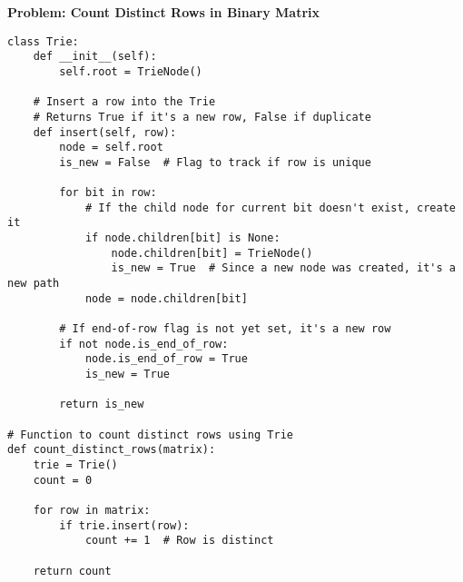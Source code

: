 \noindent\textbf{Problem: Count Distinct Rows in Binary Matrix}
\begin{verbatim}
class Trie:
    def __init__(self):
        self.root = TrieNode()

    # Insert a row into the Trie
    # Returns True if it's a new row, False if duplicate
    def insert(self, row):
        node = self.root
        is_new = False  # Flag to track if row is unique

        for bit in row:
            # If the child node for current bit doesn't exist, create it
            if node.children[bit] is None:
                node.children[bit] = TrieNode()
                is_new = True  # Since a new node was created, it's a new path
            node = node.children[bit]

        # If end-of-row flag is not yet set, it's a new row
        if not node.is_end_of_row:
            node.is_end_of_row = True
            is_new = True

        return is_new

# Function to count distinct rows using Trie
def count_distinct_rows(matrix):
    trie = Trie()
    count = 0

    for row in matrix:
        if trie.insert(row):
            count += 1  # Row is distinct

    return count
\end{verbatim}

